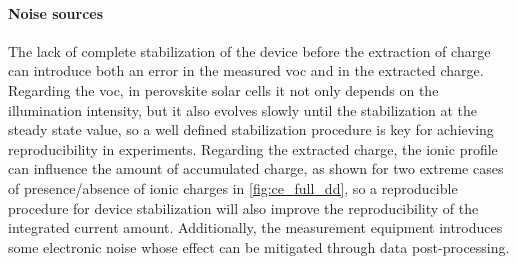 	\paragraph{Noise sources} \label{ce_noise}
	The lack of complete stabilization of the device before the extraction of charge can introduce both an error in the measured \gls{voc} and in the extracted charge.
	Regarding the \gls{voc}, in perovskite solar cells it not only depends on the illumination intensity, but it also evolves slowly until the stabilization at the steady state value, so a well defined stabilization procedure is key for achieving reproducibility in  experiments.
	Regarding the extracted charge, the ionic profile can influence the amount of accumulated charge, as shown for two extreme cases of presence/absence of ionic charges in \cref{fig:ce_full_dd}, so a reproducible procedure for device stabilization will also improve the reproducibility of the integrated current amount.
	Additionally, the measurement equipment introduces some electronic noise whose effect can be mitigated through data post-processing.

